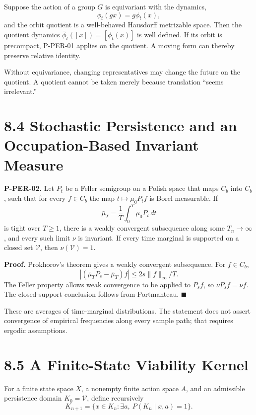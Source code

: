 \documentclass[
  english,
  11pt,
  oneside]{book}
\newcounter{none} %
\begin{document}
Suppose the action of a group \(G\) is equivariant with the dynamics, \[\phi_t(gx)=g\phi_t(x),\] and the orbit quotient is a well-behaved Hausdorff metrizable space. Then the quotient dynamics \(\bar\phi_t([x])=[\phi_t(x)]\) is well defined. If its orbit is precompact, P-PER-01 applies on the quotient. A moving form can thereby preserve relative identity.

Without equivariance, changing representatives may change the future on the quotient. A quotient cannot be taken merely because translation ``seems irrelevant.''

\section{8.4 Stochastic Persistence and an Occupation-Based Invariant Measure}\label{stochastic-persistence-and-an-occupation-based-invariant-measure}

\hypertarget{p-per-02}{}\label{p-per-02}

\textbf{P-PER-02.} Let \(P_t\) be a Feller semigroup on a Polish space that maps \(C_b\) into \(C_b\), such that for every \(f\in C_b\) the map \(t\mapsto\mu_0P_tf\) is Borel measurable. If \[\bar\mu_T=\frac1T\int_0^T\mu_0P_t\,dt\] is tight over \(T\ge1\), there is a weakly convergent subsequence along some \(T_n\to\infty\), and every such limit \(\nu\) is invariant. If every time marginal is supported on a closed set \(\mathcal V\), then \(\nu(\mathcal V)=1\).

\textbf{Proof.} Prokhorov's theorem gives a weakly convergent subsequence. For \(f\in C_b\), \[|(\bar\mu_TP_s-\bar\mu_T)f|
\le2s\|f\|_\infty/T.\] The Feller property allows weak convergence to be applied to \(P_sf\), so \(\nu P_sf=\nu f\). The closed-support conclusion follows from Portmanteau. \(\blacksquare\)

These are averages of time-marginal distributions. The statement does not assert convergence of empirical frequencies along every sample path; that requires ergodic assumptions.

\section{8.5 A Finite-State Viability Kernel}\label{a-finite-state-viability-kernel}

For a finite state space \(X\), a nonempty finite action space \(A\), and an admissible persistence domain \(K_0=\mathcal V\), define recursively \[K_{n+1}=\{x\in K_n:\exists a,\ P(K_n\mid x,a)=1\}.\]
\end{document}
